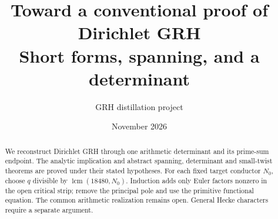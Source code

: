 
\title{Toward a conventional proof of Dirichlet GRH\\
\large Short forms, spanning, and a determinant}
\author{GRH distillation project}
\date{November 2026}

\maketitle
\begin{abstract}
We reconstruct Dirichlet GRH through one arithmetic determinant
and its prime-sum endpoint. The analytic implication and abstract
spanning, determinant and small-twist theorems are proved under
their stated hypotheses. For each fixed target conductor \(N_0\),
choose \(q\) divisible by \(\operatorname{lcm}(18480,N_0)\).
Induction adds only Euler factors nonzero in the open critical
strip; remove the principal pole and use the primitive functional
equation. The common arithmetic realization remains open.
General Hecke characters require a separate argument.
\end{abstract}
\tableofcontents


